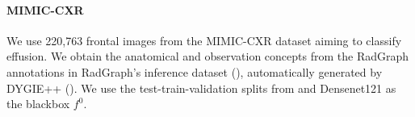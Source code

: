 \paragraph{MIMIC-CXR} We use  220,763 frontal images from the MIMIC-CXR dataset \cite{12_johnsonmimic} aiming to classify effusion. We obtain the anatomical and observation concepts from the RadGraph annotations in RadGraph’s inference dataset (\cite{10_jain2021radgraph}), automatically generated by DYGIE++ (\cite{23_wadden-etal-2019-entity}). We use the test-train-validation splits from \cite{yu2022anatomy} and Densenet121 \cite{huang2017densely} as the blackbox $f^0$. 




